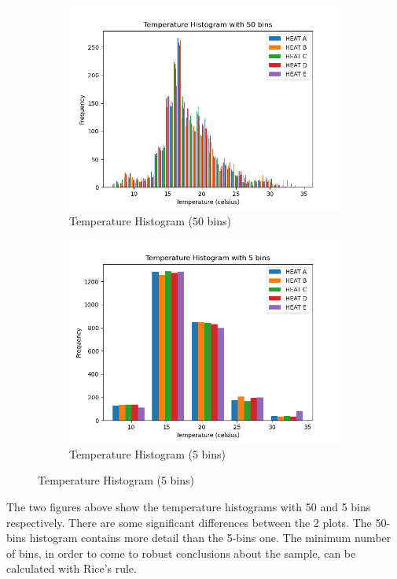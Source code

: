 \documentclass[a4paper,12pt]{article} %
\begin{document}
\begin{figure}[H] %
	\centering %
	\begin{subfigure}[b]{0.4\linewidth}
		\includegraphics[width=0.9\linewidth]{Figure_1.png} 
		\caption{Temperature Histogram (50 bins)}
		\end{subfigure}
	\begin{subfigure}[b]{0.4\linewidth}
		\includegraphics[width=0.9\linewidth]{Figure_2.png} 
		\caption{Temperature Histogram (5 bins)}
	\end{subfigure}
\end{figure}

The two figures above show the temperature histograms with 50 and 5 bins respectively. There are some significant differences between the 2 plots. The 50-bins histogram contains more detail than the 5-bins one. The minimum number of bins, in order to come to robust conclusions about the sample, can be calculated with Rice's rule.
\end{document}
